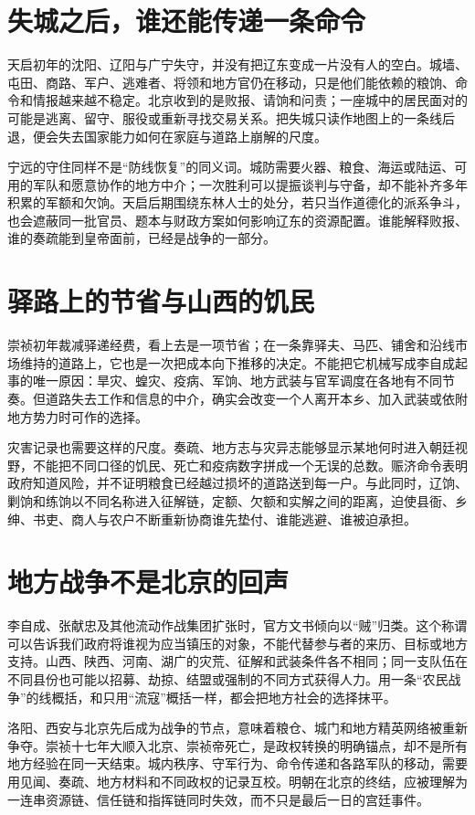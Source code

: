 \section{失城之后，谁还能传递一条命令}
\label{sec:late-ming-liaodong}

天启初年的沈阳、辽阳与广宁失守，并没有把辽东变成一片没有人的空白。城墙、屯田、商路、军户、逃难者、将领和地方官仍在移动，只是他们能依赖的粮饷、命令和情报越来越不稳定。北京收到的是败报、请饷和问责；一座城中的居民面对的可能是逃离、留守、服役或重新寻找交易关系。把失城只读作地图上的一条线后退，便会失去国家能力如何在家庭与道路上崩解的尺度。

宁远的守住同样不是“防线恢复”的同义词。城防需要火器、粮食、海运或陆运、可用的军队和愿意协作的地方中介；一次胜利可以提振谈判与守备，却不能补齐多年积累的军额和欠饷。天启后期围绕东林人士的处分，若只当作道德化的派系争斗，也会遮蔽同一批官员、题本与财政方案如何影响辽东的资源配置。谁能解释败报、谁的奏疏能到皇帝面前，已经是战争的一部分。

\section{驿路上的节省与山西的饥民}
\label{sec:late-ming-post-roads}

崇祯初年裁减驿递经费，看上去是一项节省；在一条靠驿夫、马匹、铺舍和沿线市场维持的道路上，它也是一次把成本向下推移的决定。不能把它机械写成李自成起事的唯一原因：旱灾、蝗灾、疫病、军饷、地方武装与官军调度在各地有不同节奏。但道路失去工作和信息的中介，确实会改变一个人离开本乡、加入武装或依附地方势力时可作的选择。

灾害记录也需要这样的尺度。奏疏、地方志与灾异志能够显示某地何时进入朝廷视野，不能把不同口径的饥民、死亡和疫病数字拼成一个无误的总数。赈济命令表明政府知道风险，并不证明粮食已经越过损坏的道路送到每一户。与此同时，辽饷、剿饷和练饷以不同名称进入征解链，定额、欠额和实解之间的距离，迫使县衙、乡绅、书吏、商人与农户不断重新协商谁先垫付、谁能逃避、谁被迫承担。

\section{地方战争不是北京的回声}
\label{sec:late-ming-local-war}

李自成、张献忠及其他流动作战集团扩张时，官方文书倾向以“贼”归类。这个称谓可以告诉我们政府将谁视为应当镇压的对象，不能代替参与者的来历、目标或地方支持。山西、陕西、河南、湖广的灾荒、征解和武装条件各不相同；同一支队伍在不同县份也可能以招募、劫掠、结盟或强制的不同方式获得人力。用一条“农民战争”的线概括，和只用“流寇”概括一样，都会把地方社会的选择抹平。

洛阳、西安与北京先后成为战争的节点，意味着粮仓、城门和地方精英网络被重新争夺。崇祯十七年大顺入北京、崇祯帝死亡，是政权转换的明确锚点，却不是所有地方经验在同一天结束。城内秩序、守军行为、命令传递和各路军队的移动，需要用见闻、奏疏、地方材料和不同政权的记录互校。明朝在北京的终结，应被理解为一连串资源链、信任链和指挥链同时失效，而不只是最后一日的宫廷事件。
